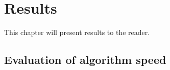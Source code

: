 \chapter{Results}
\label{sec:results}

This chapter will present results to the reader.


\section{Evaluation of algorithm speed}